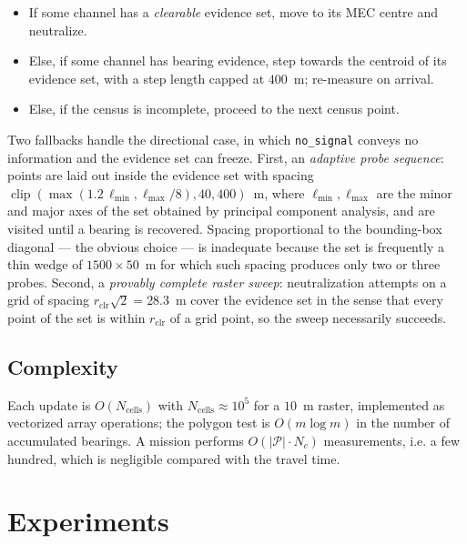 \documentclass[preprint,12pt,3p]{elsarticle}
\theoremstyle{definition}
\newcommand{\bP}{\mathcal{P}}
\begin{document}
\begin{itemize}
\item If some channel has a \emph{clearable} evidence set, move to its MEC centre and neutralize.
\item Else, if some channel has bearing evidence, step towards the centroid of its evidence set,
with a step length capped at $400$~m; re-measure on arrival.
\item Else, if the census is incomplete, proceed to the next census point.
\end{itemize}

Two fallbacks handle the directional case, in which \texttt{no\_signal} conveys no information and
the evidence set can freeze. First, an \emph{adaptive probe sequence}: points are laid out inside
the evidence set with spacing $\operatorname{clip}(\max(1.2\,\ell_{\min},\ell_{\max}/8),40,400)$~m,
where $\ell_{\min},\ell_{\max}$ are the minor and major axes of the set obtained by principal
component analysis, and are visited until a bearing is recovered. Spacing proportional to the
bounding-box diagonal --- the obvious choice --- is inadequate because the set is frequently a thin
wedge of $1500\times50$~m for which such spacing produces only two or three probes. Second, a
\emph{provably complete raster sweep}: neutralization attempts on a grid of spacing
$r_{\mathrm{clr}}\sqrt2=28.3$~m cover the evidence set in the sense that every point of the set is
within $r_{\mathrm{clr}}$ of a grid point, so the sweep necessarily succeeds.

\subsection{Complexity}
Each update is $O(N_{\mathrm{cells}})$ with $N_{\mathrm{cells}}\approx10^5$ for a $10$~m raster,
implemented as vectorized array operations; the polygon test is $O(m\log m)$ in the number of
accumulated bearings. A mission performs $O(|\bP|\cdot N_c)$ measurements, i.e. a few hundred,
which is negligible compared with the travel time.

\section{Experiments}
\label{sec:experiments}
\end{document}

